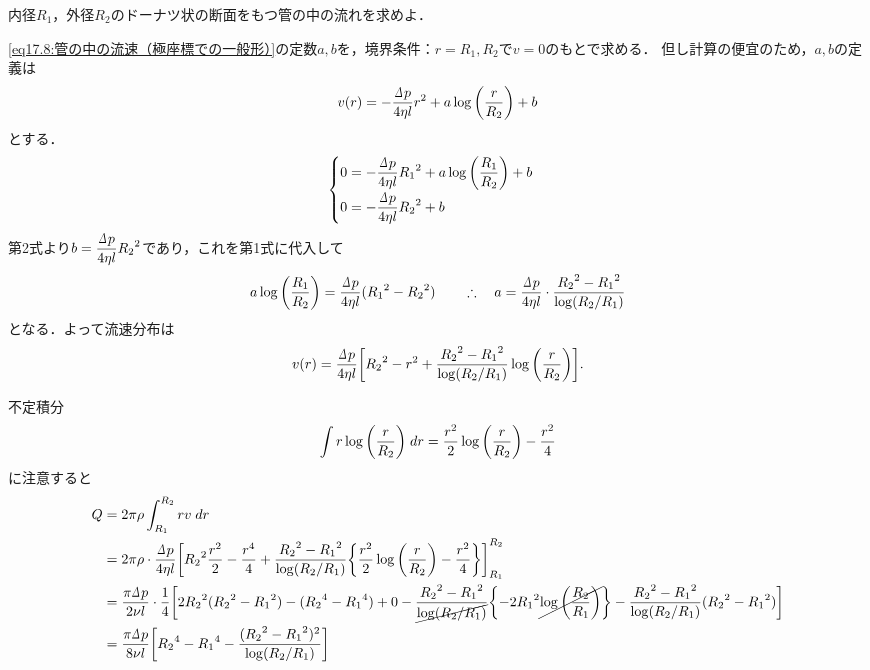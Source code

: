 \begin{mondai}{}{}
内径$R_1$，外径$R_2$のドーナツ状の断面をもつ管の中の流れを求めよ．
\end{mondai}
\begin{kaitou}
\eqref{eq17.8:管の中の流速（極座標での一般形）}の定数$a,b$を，境界条件：$r=R_1,R_2$で$v=0$のもとで求める．
但し計算の便宜のため，$a,b$の定義は
\[
    v(r) = -\frac{\D p}{4\eta l}r^2 + a \log\pqty{\frac{r}{R_2}} + b
\]
とする．
\[
    \begin{cases}
        0 = -\dfrac{\D p}{4\eta l} {R_1}^2 + a \log\pqty{\dfrac{R_1}{R_2}} + b \\[7pt]
        0 = -\dfrac{\D p}{4\eta l} {R_2}^2 + b \\
    \end{cases}
\]
第2式より$b = \dfrac{\D p}{4\eta l}{R_2}^2$であり，これを第1式に代入して
\[
    a \log\pqty{\frac{R_1}{R_2}} = \frac{\D p}{4\eta l} ({R_1}^2-{R_2}^2)
    \qquad\yueni a = \frac{\D p}{4\eta l} \cdot \frac{ {R_2}^2-{R_1}^2 }{\log(R_2/R_1)}
\]
となる．よって流速分布は
\[
    v(r) = \frac{\D p}{4\eta l} \bqty{ {R_2}^2 - r^2 + \frac{ {R_2}^2-{R_1}^2 }{\log(R_2/R_1)} \log\pqty{\frac{r}{R_2}} } .
\]


不定積分
\[
    \int r \log\pqty{\frac{r}{R_2}} \; dr = \frac{r^2}{2} \log\pqty{\frac{r}{R_2}} - \frac{r^2}{4}  
\]
に注意すると
\begin{align*}
    Q &= 2\pi\rho \int_{R_1}^{R_2} rv \; dr \\
    &= 2\pi\rho \cdot \frac{\D p}{4\eta l} \bqty{ 
        {R_2}^2\frac{r^2}{2} - \frac{r^4}{4} + \frac{ {R_2}^2-{R_1}^2 }{\log(R_2/R_1)} \Bqty{ \frac{r^2}{2} \log\pqty{\frac{r}{R_2}} - \frac{r^2}{4} }
    }_{R_1}^{R_2} \\
    &= \frac{\pi\D p}{2\nu l} \cdot \frac{1}{4} \bqty{
        2{R_2}^2 ({R_2}^2-{R_1}^2) - ( {R_2}^4-{R_1}^4 ) + 0
        - \frac{ {R_2}^2-{R_1}^2 }{\cancel{\log(R_2/R_1)}} \Bqty{ -2{R_1}^2 \cancel{\log\pqty{\frac{R_2}{R_1}}} }
        - \frac{ {R_2}^2-{R_1}^2 }{\log(R_2/R_1)} ({R_2}^2-{R_1}^2)
    } \\
    &= \frac{\pi\D p}{8\nu l} \bqty{ {R_2}^4-{R_1}^4 - \frac{ ({R_2}^2-{R_1}^2)^2 }{\log(R_2/R_1)} }
\end{align*}


    
\end{kaitou}








